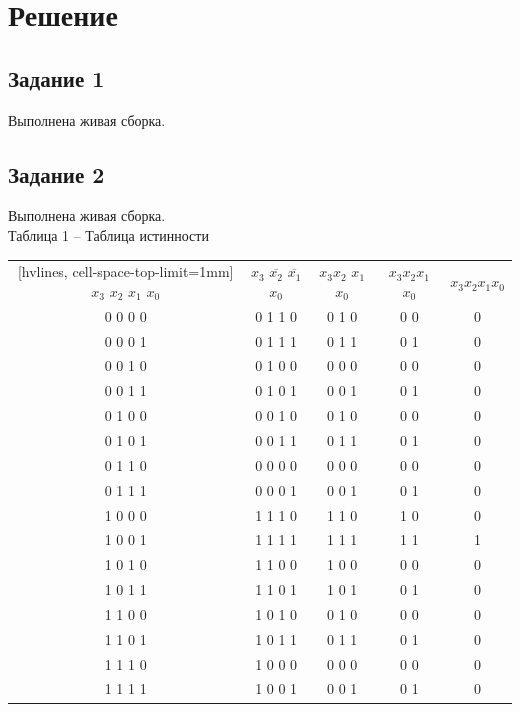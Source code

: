 \documentclass[a4paper,14pt]{extarticle}
\begin{document}
  \newpage
  \section*{\hspace{12.5mm}Решение}
  \subsection*{\hspace{12.5mm}Задание 1}
  Выполнена живая сборка.

  \subsection*{\hspace{12.5mm}Задание 2}
  Выполнена живая сборка. \\

  \noindent Таблица 1 -- Таблица истинности\\
  \begin{NiceTabular}{ccccc}[hvlines, cell-space-top-limit=1mm]
    $x_3$ $x_2$ $x_1$ $x_0$ & $x_3$ $\overline{x_2}$ $\overline{x_1}$ $x_0$ & $x_3 x_2$ $x_1$ $x_0$ & $x_3 x_2 x_1$ $x_0$ & $x_3 x_2 x_1 x_0$\\

    0 0 0 0 & 0 1 1 0 & 0 1 0 & 0 0 & 0 \\
    0 0 0 1 & 0 1 1 1 & 0 1 1 & 0 1 & 0 \\
    0 0 1 0 & 0 1 0 0 & 0 0 0 & 0 0 & 0 \\
    0 0 1 1 & 0 1 0 1 & 0 0 1 & 0 1 & 0 \\
    0 1 0 0 & 0 0 1 0 & 0 1 0 & 0 0 & 0 \\
    0 1 0 1 & 0 0 1 1 & 0 1 1 & 0 1 & 0 \\
    0 1 1 0 & 0 0 0 0 & 0 0 0 & 0 0 & 0 \\
    0 1 1 1 & 0 0 0 1 & 0 0 1 & 0 1 & 0 \\
    1 0 0 0 & 1 1 1 0 & 1 1 0 & 1 0 & 0 \\
    1 0 0 1 & 1 1 1 1 & 1 1 1 & 1 1 & 1 \\
    1 0 1 0 & 1 1 0 0 & 1 0 0 & 0 0 & 0 \\
    1 0 1 1 & 1 1 0 1 & 1 0 1 & 0 1 & 0 \\
    1 1 0 0 & 1 0 1 0 & 0 1 0 & 0 0 & 0 \\
    1 1 0 1 & 1 0 1 1 & 0 1 1 & 0 1 & 0 \\
    1 1 1 0 & 1 0 0 0 & 0 0 0 & 0 0 & 0 \\
    1 1 1 1 & 1 0 0 1 & 0 0 1 & 0 1 & 0 \\
  \end{NiceTabular}\\
\end{document}
